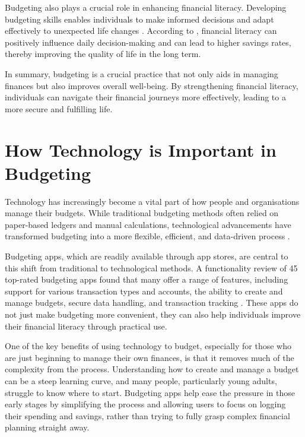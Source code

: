 \documentclass{l4proj}
\begin{document}
Budgeting also plays a crucial role in enhancing financial literacy. Developing budgeting skills enables individuals to make informed decisions and adapt effectively to unexpected life changes \citep{gorshkova_nv_and_mytareva_leyla_and_perekrestova_lv_and_glushchenko_av_and_fisher_ov_system_2015}. According to \citet{navickas_influence_2014}, financial literacy can positively influence daily decision-making and can lead to higher savings rates, thereby improving the quality of life in the long term.

In summary, budgeting is a crucial practice that not only aids in managing finances but also improves overall well-being. By strengthening financial literacy, individuals can navigate their financial journeys more effectively, leading to a more secure and fulfilling life.

\section{How Technology is Important in Budgeting}
Technology has increasingly become a vital part of how people and organisations manage their budgets. While traditional budgeting methods often relied on paper-based ledgers and manual calculations, technological advancements have transformed budgeting into a more flexible, efficient, and data-driven process \citep{sonjaya_exploring_2024}. 

Budgeting apps, which are readily available through app stores, are central to this shift from traditional to technological methods. A functionality review of 45 top-rated budgeting apps found that many offer a range of features, including support for various transaction types and accounts, the ability to create and manage budgets, secure data handling, and transaction tracking \citep{alenazi_creating_2024}. These apps do not just make budgeting more convenient, they can also help individuals improve their financial literacy through practical use.

One of the key benefits of using technology to budget, especially for those who are just beginning to manage their own finances, is that it removes much of the complexity from the process. Understanding how to create and manage a budget can be a steep learning curve, and many people, particularly young adults, struggle to know where to start. Budgeting apps help ease the pressure in those early stages by simplifying the process and allowing users to focus on logging their spending and savings, rather than trying to fully grasp complex financial planning straight away. 
\end{document}
